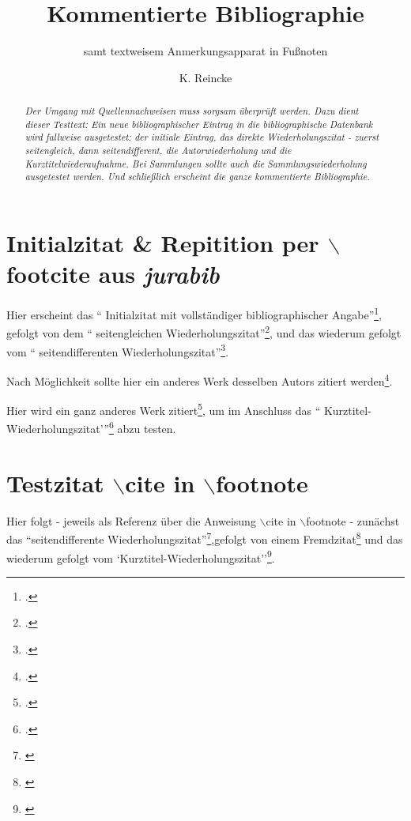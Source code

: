 \documentclass[DIV=calc,BCOR=5mm,11pt,headings=small,oneside,abstract=true, toc=bib]{scrartcl}
\begin{document}
\nocite{*}

\titlehead{Bibliographietest}
\subject{Zum Testen \itshape{neuer bibliographischer Angaben}}
\title{Kommentierte Bibliographie}
\subtitle{samt textweisem Anmerkungsapparat in Fußnoten}
\author{K. Reincke}

\maketitle

\begin{abstract}
\noindent \itshape
Der Umgang mit Quellennachweisen muss sorgsam überprüft werden. Dazu dient
dieser Testtext: Ein neue bibliographischer Eintrag in die bibliographische
Datenbank wird fallweise ausgetestet: der initiale Eintrag, das direkte
Wiederholungszitat - zuerst seitengleich, dann seitendifferent, die
Autorwiederholung und die Kurztitelwiederaufnahme. Bei Sammlungen sollte auch
die Sammlungswiederholung ausgetestet werden. Und schließlich erscheint die
ganze kommentierte Bibliographie.
\end{abstract}

\section{Initialzitat \& Repitition per $\backslash$footcite aus \emph{jurabib}}

Hier erscheint das \enquote{ Initialzitat mit vollständiger bibliographischer
Angabe}\footcite[vgl. dazu:][123ff]{Buchtala2007a}, gefolgt von dem \enquote{
seitengleichen Wiederholungszitat}\footcite[vgl. dazu:][123ff]{Buchtala2007a},
und das wiederum gefolgt vom \enquote{ seitendifferenten
Wiederholungszitat}\footcite[vgl. dazu:][125f]{Buchtala2007a}.

Nach Möglichkeit sollte hier ein anderes Werk desselben Autors zitiert
werden\footcite[vgl. dazu:][321]{Buchtala2007a}.

Hier wird ein ganz anderes Werk zitiert\footcite[vgl.
dazu:][42]{Spielkamp2008a}, um im Anschluss das \enquote{
Kurztitel-Wiederholungszitat'}\footcite[vgl. dazu:][123]{Buchtala2007a} abzu
testen.

\section{Testzitat $\backslash$cite in $\backslash$footnote}

Hier folgt - jeweils als Referenz über die Anweisung $\backslash$cite in
$\backslash$footnote - zunächst das ``seitendifferente
Wiederholungszitat''\footnote{\cite[vgl. dazu:][125]{Buchtala2007a}},gefolgt von
einem Fremdzitat\footnote{\cite[vgl. dazu:][42]{Spielkamp2008a}} und das
wiederum gefolgt vom `Kurztitel-Wiederholungszitat''\footnote{\cite[vgl.
dazu:][125]{Buchtala2007a}}.


\small

\end{document}
